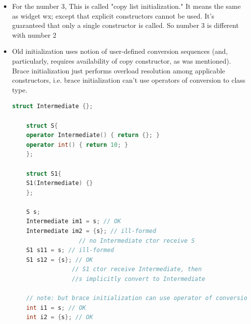 \documentclass[a4paper,11pt,twoside]{book}
\begin{document}
\begin{itemize}
	
	\item For the number 3, This is called "copy list initialization." It means the same as widget w{x}; except that explicit constructors cannot be used. It's guaranteed that only a single constructor is called. So number 3 is different with number 2
	
	\item Old initialization uses notion of user-defined conversion sequences (and, particularly, requires availability of copy constructor, as was mentioned). Brace initialization just performs overload resolution among applicable constructors, i.e. brace initialization can't use operators of conversion to class type.
	
	\begin{lstlisting}[frame=single, language=c++]
	struct Intermediate {};
	
	struct S{
	operator Intermediate() { return {}; }
	operator int() { return 10; }
	};
	
	struct S1{
	S1(Intermediate) {}
	};
	
	S s;
	Intermediate im1 = s; // OK
	Intermediate im2 = {s}; // ill-formed
	               // no Intermediate ctor receive S
	S1 s11 = s; // ill-formed
	S1 s12 = {s}; // OK
	             // S1 ctor receive Intermediate, then 
	             //s implicitly convert to Intermediate
	
	// note: but brace initialization can use operator of conversion to int
	int i1 = s; // OK
	int i2 = {s}; // OK
	\end{lstlisting}
	
\end{itemize}
\end{document}
